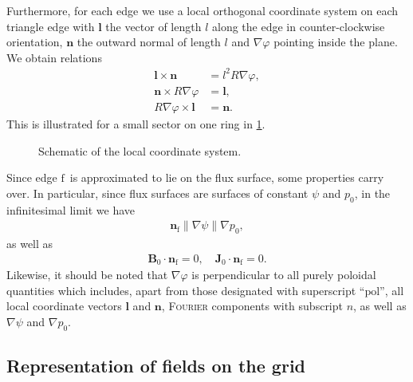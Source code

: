 \documentclass[a4paper, twoside, 10pt, english]{article}
\numberwithin{equation}{section}
\let\temp\varrho
\let\varrho\rho
\let\rho\temp
\let\temp\vartheta
\let\vartheta\theta
\let\theta\temp
\let\temp\varphi
\let\varphi\phi
\let\phi\temp
\let\vec\symbf
\newcommand*\grad{\ensuremath{\nabla}}
\newcommand*\pol{\ensuremath{\textrm{pol}}}  %
\newcommand*\fs{\ensuremath{\textrm{f}}}  %
\begin{document}
Furthermore, for each edge we use a local orthogonal coordinate system on each triangle edge with $\vec{l}$ the vector of length $l$ along the edge in counter-clockwise orientation, $\vec{n}$ the outward normal of length $l$ and $\grad \phi$ pointing inside the plane. We obtain relations
\begin{align}
  \vec{l} \times \vec{n} &= l^{2} R \grad \phi, \label{eq:edge_phi} \\
  \vec{n} \times R \grad \phi &= \vec{l}, \label{eq:edge_l} \\
  R \grad \phi \times \vec{l} &= \vec{n}. \label{eq:edge_n}
\end{align}
This is illustrated for a small sector on one ring in \cref{fig:local_coordinates}.
\begin{figure}[bth]
  \centering
  
  \caption{Schematic of the local coordinate system.}
  \label{fig:local_coordinates}
\end{figure}

Since edge \fs\ is approximated to lie on the flux surface, some properties carry over. In particular, since flux surfaces are surfaces of constant $\psi$ and $p_{0}$, in the infinitesimal limit we have
\begin{gather}
  \vec{n}_{\fs} \parallel \grad \psi \parallel \grad p_{0},
\end{gather}
as well as
\begin{gather}
  \vec{B}_{0} \cdot \vec{n}_{\fs} = 0, \quad \vec{J}_{0} \cdot \vec{n}_{\fs} = 0.
\end{gather}
Likewise, it should be noted that $\grad \phi$ is perpendicular to all purely poloidal quantities which includes, apart from those designated with superscript \enquote{\pol}, all local coordinate vectors $\vec{l}$ and $\vec{n}$, \textsc{Fourier} components with subscript $n$, as well as $\grad \psi$ and $\grad p_{0}$.

\subsection{Representation of fields on the grid}
\label{sec:dofs}
\end{document}
